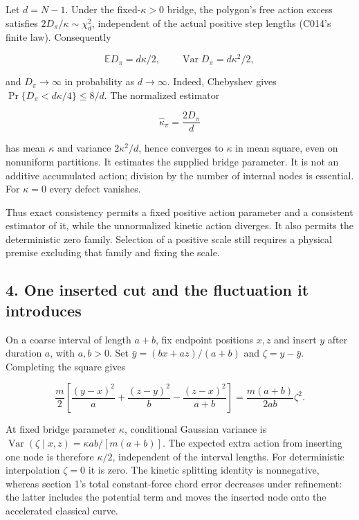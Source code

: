 \documentclass[11pt,a4paper]{article}
\begin{document}
Let \(d=N-1\). Under the fixed-\(\kappa>0\) bridge, the polygon's free
action excess satisfies \(2D_\pi/\kappa\sim\chi_d^2\), independent of
the actual positive step lengths (C014's finite law). Consequently

\[\mathbb E D_\pi=d\kappa/2,\qquad
\operatorname{Var}D_\pi=d\kappa^2/2,\]

and \(D_\pi\to\infty\) in probability as \(d\to\infty\). Indeed,
Chebyshev gives \(\Pr\{D_\pi<d\kappa/4\}\le8/d\). The normalized
estimator

\[\widehat\kappa_\pi=\frac{2D_\pi}{d}\]

has mean \(\kappa\) and variance \(2\kappa^2/d\), hence converges to
\(\kappa\) in mean square, even on nonuniform partitions. It estimates
the supplied bridge parameter. It is not an additive accumulated action;
division by the number of internal nodes is essential. For \(\kappa=0\)
every defect vanishes.

Thus exact consistency permits a fixed positive action parameter and a
consistent estimator of it, while the unnormalized kinetic action
diverges. It also permits the deterministic zero family. Selection of a
positive scale still requires a physical premise excluding that family
and fixing the scale.

\hypertarget{one-inserted-cut-and-the-fluctuation-it-introduces}{%
\subsection{4. One inserted cut and the fluctuation it
introduces}\label{one-inserted-cut-and-the-fluctuation-it-introduces}}

On a coarse interval of length \(a+b\), fix endpoint positions \(x,z\)
and insert \(y\) after duration \(a\), with \(a,b>0\). Set
\(\bar y=(bx+az)/(a+b)\) and \(\zeta=y-\bar y\). Completing the square
gives

\[\frac m2\left[\frac{(y-x)^2}{a}+\frac{(z-y)^2}{b}
-\frac{(z-x)^2}{a+b}\right]
=\frac{m(a+b)}{2ab}\zeta^2.\]

At fixed bridge parameter \(\kappa\), conditional Gaussian variance is
\(\operatorname{Var}(\zeta\mid x,z)=\kappa ab/[m(a+b)]\). The expected
extra action from inserting one node is therefore \(\kappa/2\),
independent of the interval lengths. For deterministic interpolation
\(\zeta=0\) it is zero. The kinetic splitting identity is nonnegative,
whereas section 1's total constant-force chord error decreases under
refinement: the latter includes the potential term and moves the
inserted node onto the accelerated classical curve.
\end{document}

